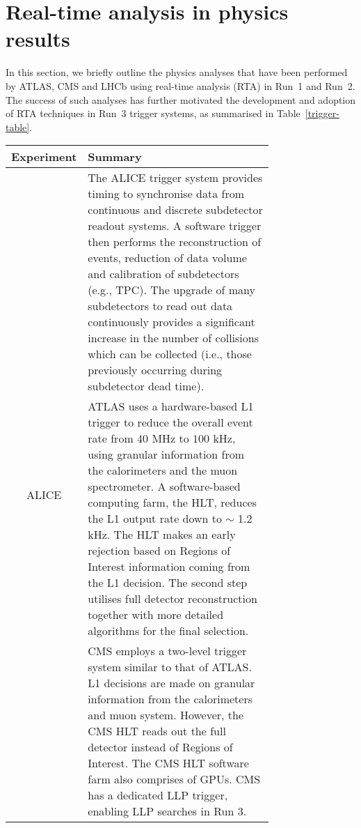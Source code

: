\section{Real-time analysis in physics results}
\label{sec:RTA_physics}

In this section, we briefly outline the physics analyses that have been performed by ATLAS, CMS and LHCb using real-time analysis (RTA) in Run~1 and Run~2. The success of such analyses has further motivated the development and adoption of RTA techniques in Run~3 trigger systems, as summarised in Table~\ref{trigger-table}.

\begin{table}[h!]
    \centering
    \begin{tabular}{c|p{0.75\linewidth}}
        \thickhline
        \small{\textbf{Experiment}} & \textbf{Summary} \\
        \hline\hline
        \multirow{3}{*}{\small{ALICE}}
            & \small{The ALICE trigger system provides timing to synchronise data from continuous and discrete subdetector readout systems. A software trigger then performs the reconstruction of events, reduction of data volume and calibration of subdetectors (e.g., TPC). The upgrade of many subdetectors to read out data continuously provides a significant increase in the number of collisions which can be collected (i.e., those previously occurring during subdetector dead time).} \\
        \hline
        \multirow{3}{*}{\small{ATLAS}}
            & \small{ATLAS uses a hardware-based L1 trigger to reduce the overall event rate from $40$ MHz to $100$ kHz, using granular information from the calorimeters and the muon spectrometer. A software-based computing farm, the HLT, reduces the L1 output rate down to $\sim$ 1.2 kHz. The HLT makes an early rejection based on Regions of Interest information coming from the L1 decision. The second step utilises full detector reconstruction together with more detailed algorithms for the final selection.} \\ \hline
        \multirow{3}{*}{\small{CMS}}
            & CMS employs a two-level trigger system similar to that of ATLAS. L1 decisions are made on granular information from the calorimeters and muon system. However, the CMS HLT reads out the full detector instead of Regions of Interest. The CMS HLT software farm also comprises of GPUs. CMS has a dedicated LLP trigger, enabling LLP searches in Run 3. \\ \hline

\end{tabular}
\end{table}
